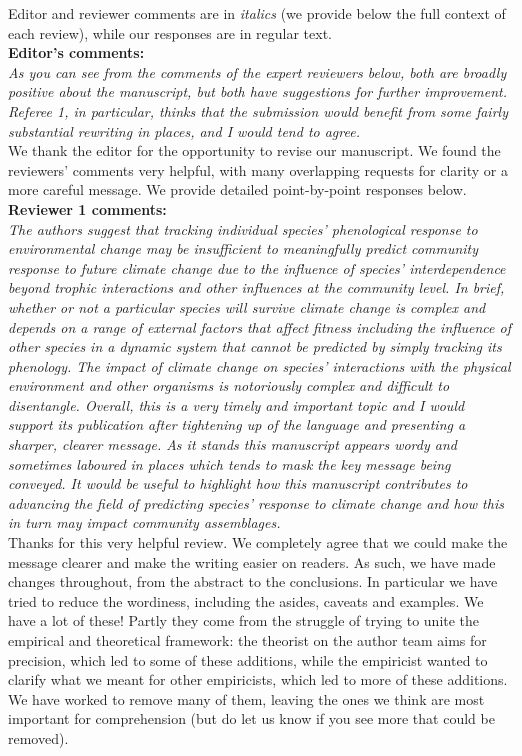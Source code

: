\documentclass[11pt]{article}
\begin{document}
Editor and reviewer comments are in \emph{italics} (we provide below the full context of each review), while our responses are in regular text. \\ 

{\bf Editor's comments:} \\

\emph{As you can see from the comments of the expert reviewers below, both are broadly positive
about the manuscript, but both have suggestions for further improvement. Referee 1, in
particular, thinks that the submission would benefit from some fairly substantial rewriting
in places, and I would tend to agree.}\\

We thank the editor for the opportunity to revise our manuscript. We found the reviewers' comments very helpful, with many overlapping requests for clarity or a more careful message. We provide detailed point-by-point responses below.\\

{\bf Reviewer 1 comments:} \\


\emph{The authors suggest that tracking individual species' phenological response to environmental
change may be insufficient to meaningfully predict community response to future climate
change due to the influence of species' interdependence beyond trophic interactions and other
influences at the community level. In brief, whether or not a particular species will survive
climate change is complex and depends on a range of external factors that affect fitness
including the influence of other species in a dynamic system that cannot be predicted by
simply tracking its phenology. The impact of climate change on species' interactions with the
physical environment and other organisms is notoriously complex and difficult to disentangle.
Overall, this is a very timely and important topic and I would support its publication after
tightening up of the language and presenting a sharper, clearer message. As it stands this
manuscript appears wordy and sometimes laboured in places which tends to mask the key message
being conveyed. It would be useful to highlight how this manuscript contributes to advancing
the field of predicting species' response to climate change and how this in turn may impact
community assemblages.}\\

Thanks for this very helpful review. We completely agree that we could make the message clearer and make the writing easier on readers. As such, we have made changes throughout, from the abstract to the conclusions. In particular we have tried to reduce the wordiness, including the asides, caveats and examples. We have a lot of these! Partly they come from the struggle of trying to unite the empirical and theoretical framework: the theorist on the author team aims for precision, which led to some of these additions, while the empiricist wanted to clarify what we meant for other empiricists, which led to more of these additions. We have worked to remove many of them, leaving the ones we think are most important for comprehension (but do let us know if you see more that could be removed).  \\
\end{document}
